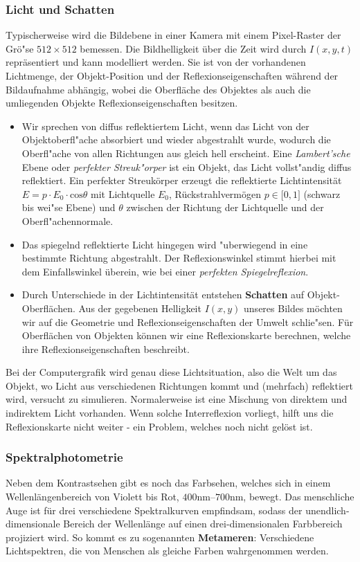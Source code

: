 \subsubsection{Licht und Schatten}

Typischerweise wird die Bildebene in einer Kamera mit einem Pixel-Raster der Grö"se $512\times 512$ bemessen. Die Bildhelligkeit über die Zeit wird durch $I(x,y,t)$ repräsentiert und kann modelliert werden. Sie ist von der vorhandenen Lichtmenge, der Objekt-Position und der Reflexionseigenschaften während der Bildaufnahme abhängig, wobei die Oberfläche des Objektes als auch die umliegenden Objekte Reflexionseigenschaften besitzen.
\begin{itemize}
\item
Wir sprechen von diffus reflektiertem Licht, wenn das Licht von der Objektoberfl"ache absorbiert und wieder abgestrahlt wurde, wodurch die Oberfl"ache von allen Richtungen aus gleich hell erscheint. Eine \textit{Lambert'sche} Ebene oder \emph{perfekter Streuk"orper} ist ein Objekt, das Licht vollst"andig diffus reflektiert. Ein perfekter Streukörper erzeugt die reflektierte Lichtintensität
$E = p\cdot E_0\cdot \mathrm{cos}\theta$
mit Lichtquelle $E_0$, Rückstrahlvermögen $p\in\lbrack 0,1\rbrack$ (schwarz bis wei"se Ebene) und $\theta$ zwischen der Richtung der Lichtquelle und der Oberfl"achennormale.
\item
Das spiegelnd reflektierte Licht hingegen wird "uberwiegend in eine bestimmte Richtung abgestrahlt. Der Reflexionswinkel stimmt hierbei mit dem Einfallswinkel überein, wie bei einer \textit{perfekten Spiegelreflexion}.
\item
Durch Unterschiede in der Lichtintensität entstehen \textbf{Schatten} auf Objekt-Oberflächen. Aus der gegebenen Helligkeit $I(x,y)$ unseres Bildes möchten wir auf die Geometrie und Reflexionseigenschaften der Umwelt schlie"sen. Für Oberflächen von Objekten können wir eine Reflexionskarte berechnen, welche ihre Reflexionseigenschaften beschreibt.
\end{itemize}
Bei der Computergrafik wird genau diese Lichtsituation, also die Welt um das Objekt, wo Licht aus verschiedenen Richtungen kommt und (mehrfach) reflektiert wird, versucht zu simulieren.
Normalerweise ist eine Mischung von direktem und indirektem Licht vorhanden. Wenn solche Interreflexion vorliegt, hilft uns die Reflexionskarte nicht weiter - ein Problem, welches noch nicht gelöst ist.

\subsubsection{Spektralphotometrie}

Neben dem Kontrastsehen gibt es noch das Farbsehen, welches sich in einem Wellenlängenbereich von Violett bis Rot, $400$nm--$700$nm, bewegt. Das menschliche Auge ist für drei verschiedene Spektralkurven empfindsam, sodass der unendlich-dimensionale Bereich der Wellenlänge auf einen drei-dimensionalen Farbbereich projiziert wird. So kommt es zu sogenannten \textbf{Metameren}: Verschiedene Lichtspektren, die von Menschen als gleiche Farben wahrgenommen werden.
